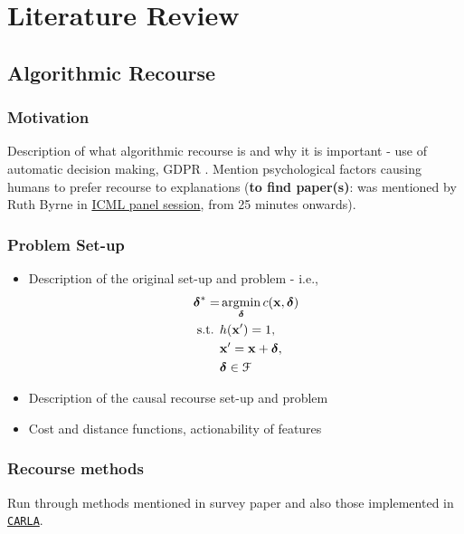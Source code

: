 \chapter{Literature Review} \label{chapter:lit_review}

\section{Algorithmic Recourse}

\subsection{Motivation}
Description of what algorithmic recourse is and why it is important - use of automatic decision making, GDPR \citep{voigtEUGeneralData2017}. Mention psychological factors causing humans to prefer recourse to explanations (\textbf{to find paper(s)}: was mentioned by Ruth Byrne in \href{https://icml.cc/virtual/2021/11705}{ICML panel session}, from 25 minutes onwards).


\subsection{Problem Set-up}
\begin{itemize}
	\item Description of the original set-up and problem - i.e., 	
	\begin{align} \label{eq:recourse_setup}
		\boldsymbol{\delta}^* = & \operatorname*{argmin}_{\boldsymbol{\delta}} c(\mathbf{x}, \boldsymbol{\delta}) \\ \nonumber
		\text{s.t. } & h(\mathbf{x}') = 1, \\ \nonumber
		& \mathbf{x}' = \mathbf{x} + \boldsymbol{\delta}, \\ \nonumber
		& \boldsymbol{\delta} \in \mathcal{F}
	\end{align} 
	
	\item Description of the causal recourse set-up and problem \citep{karimiAlgorithmicRecourseCounterfactual2021}
	\item Cost and distance functions, actionability of features
\end{itemize}


\subsection{Recourse methods}
Run through methods mentioned in survey paper \citep{karimiSurveyAlgorithmicRecourse2022} and also those implemented in \href{https://carla-counterfactual-and-recourse-library.readthedocs.io/en/latest/recourse.html}{\texttt{CARLA}}.





